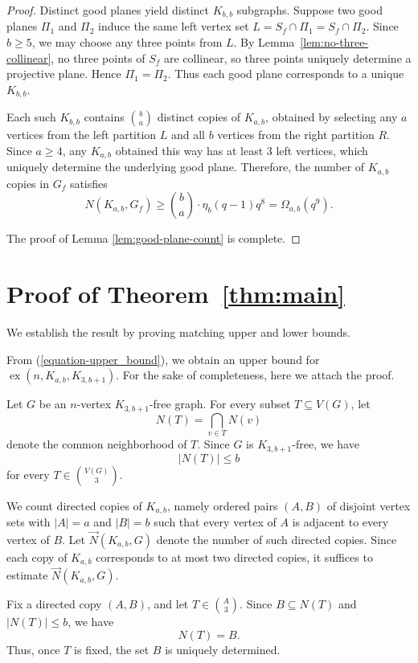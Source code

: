 \documentclass[11pt,a4paper]{article}
\theoremstyle{definition}
\theoremstyle{remark}
\newcommand{\ex}{\operatorname{ex}}
\begin{document}
\begin{proof}
Distinct good planes yield distinct $K_{b,b}$ subgraphs. Suppose two good planes $\Pi_1$ and $\Pi_2$ induce the same left vertex set $L = S_f \cap \Pi_1 = S_f \cap \Pi_2$. Since $b \geq 5$, we may choose any three points from $L$. By Lemma~\ref{lem:no-three-collinear}, no three points of $S_f$ are collinear, so three points uniquely determine a projective plane. Hence $\Pi_1 = \Pi_2$. Thus each good plane corresponds to a unique $K_{b,b}$.

Each such $K_{b,b}$ contains $\binom{b}{a}$ distinct copies of $K_{a,b}$, obtained by selecting any $a$ vertices from the left partition $L$ and all $b$ vertices from the right partition $R$. Since $a \geq 4$, any $K_{a,b}$ obtained this way has at least $3$ left vertices, which uniquely determine the underlying good plane. Therefore,  the number of $K_{a,b}$ copies in $G_f$ satisfies
\[
N(K_{a,b}, G_f) \geq \binom{b}{a} \cdot \eta_b (q-1) q^8 = \Omega_{a,b}(q^9).
\]

The proof of Lemma \ref{lem:good-plane-count} is complete.
\end{proof}





\section{Proof of Theorem~\ref{thm:main}}\label{sec:proof}

We establish the result by proving matching upper and lower bounds.

From (\ref{equation-upper_bound}), we obtain an upper bound for $\ex(n, K_{a,b}, K_{3,b+1})$. For the sake of completeness, here we attach the proof. 

Let $G$ be an $n$-vertex $K_{3,b+1}$-free graph. For every subset $T\subseteq V(G)$, let
\[
N(T)=\bigcap_{v\in T}N(v)
\]
denote the common neighborhood of $T$. Since $G$ is $K_{3,b+1}$-free, we have
\[
|N(T)|\le b
\]
for every $T\in\binom{V(G)}{3}$.

We count directed copies of $K_{a,b}$, namely ordered pairs $(A,B)$ of disjoint vertex sets with
$|A|=a$ and $|B|=b$ such that every vertex of $A$ is adjacent to every vertex of $B$. Let
$\vec{N}(K_{a,b},G)$ denote the number of such directed copies. Since each copy of $K_{a,b}$
corresponds to at most two directed copies, it suffices to estimate
$\vec{N}(K_{a,b},G)$.

Fix a directed copy $(A,B)$, and let $T\in\binom{A}{3}$. Since
$B\subseteq N(T)$ and $|N(T)|\le b$, we have
\[
N(T)=B.
\]
Thus, once $T$ is fixed, the set $B$ is uniquely determined.
\end{document}

